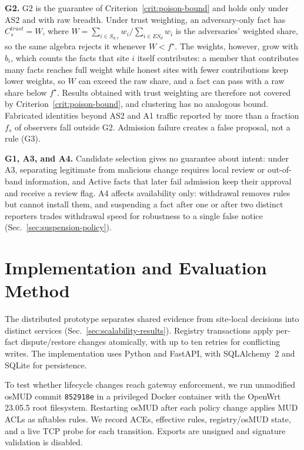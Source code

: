 \documentclass[journal]{IEEEtran}
\theoremstyle{definition}
\begin{document}
\textbf{G2.} G2 is the guarantee of Criterion~\ref{crit:poison-bound} and holds only under AS2 and with raw breadth. Under trust weighting, an adversary-only fact has $C_s^{trust}=W$, where $W=\sum_{i\in S_{d,e}}w_i/\sum_{i\in ES_d}w_i$ is the adversaries' weighted share, so the same algebra rejects it whenever $W<f^\star$. The weights, however, grow with $b_i$, which counts the facts that site $i$ itself contributes: a member that contributes many facts reaches full weight while honest sites with fewer contributions keep lower weights, so $W$ can exceed the raw share, and a fact can pass with a raw share below $f^\star$. Results obtained with trust weighting are therefore not covered by Criterion~\ref{crit:poison-bound}, and clustering has no analogous bound. Fabricated identities beyond AS2 and A1 traffic reported by more than a fraction $f_s$ of observers fall outside G2. Admission failure creates a false proposal, not a rule (G3).

\textbf{G1, A3, and A4.} Candidate selection gives no guarantee about intent: under A3, separating legitimate from malicious change requires local review or out-of-band information, and Active facts that later fail admission keep their approval and receive a review flag. A4 affects availability only: withdrawal removes rules but cannot install them, and suspending a fact after one or after two distinct reporters trades withdrawal speed for robustness to a single false notice (Sec.~\ref{sec:suspension-policy}).

\section{Implementation and Evaluation Method}
\label{sec:impl}
The distributed prototype separates shared evidence from site-local decisions into distinct services (Sec.~\ref{sec:scalability-results}). Registry transactions apply per-fact dispute/restore changes atomically, with up to ten retries for conflicting writes. The implementation uses Python and FastAPI, with SQLAlchemy~2 and SQLite for persistence.

To test whether lifecycle changes reach gateway enforcement, we run unmodified osMUD commit \texttt{852918e} in a privileged Docker container with the OpenWrt 23.05.5 root filesystem. Restarting osMUD after each policy change applies MUD ACLs as nftables rules. We record ACEs, effective rules, registry/osMUD state, and a live TCP probe for each transition. Exports are unsigned and signature validation is disabled.
\end{document}
